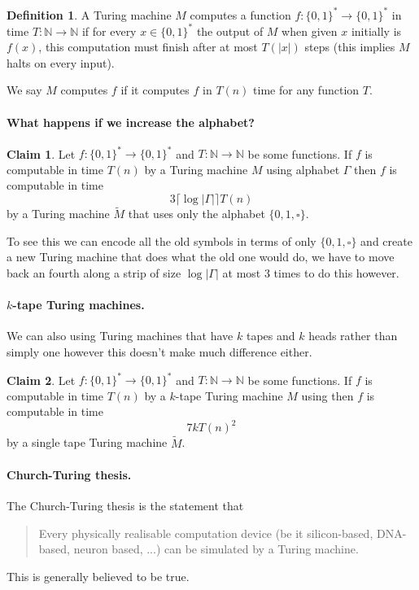 \documentclass[11pt,a4paper]{article}
\theoremstyle{definition}
\newtheorem{claim}{Claim}
\newtheorem{defn}{Definition}
\newcommand{\NN}{\mathbb{N}}
\begin{document}
\begin{defn}
A Turing machine $M$ computes a function $f\colon \{0,1\}^* \to \{0,1\}^*$ in time $T\colon \NN \to \NN$ if for every $x\in \{0,1\}^*$ the output of $M$ when given $x$ initially is $f(x)$, this computation must finish after at most $T(|x|)$ steps (this implies $M$ halts on every input).

We say $M$ computes $f$ if it computes $f$ in $T(n)$ time for any function $T$.
\end{defn}

\paragraph{What happens if we increase the alphabet?}
\begin{claim}
Let $f\colon\{0,1\}^*\to\{0,1\}^*$ and $T\colon \NN \to \NN$ be some functions.
If $f$ is computable in time $T(n)$ by a Turing machine $M$ using alphabet $\Gamma$ then $f$ is computable in time
\[
3\lceil\log|\Gamma|\rceil T(n)
\]
by a Turing machine $\tilde{M}$ that uses only the alphabet $\{0,1,\square\}$.
\end{claim}
To see this we can encode all the old symbols in terms of only $\{0,1,\square\}$ and create a new Turing machine that does what the old one would do, we have to move back an fourth along a strip of size $\log|\Gamma|$ at most 3 times to do this however.

\paragraph{$k$-tape Turing machines.}
We can also using Turing machines that have $k$ tapes and $k$ heads rather than simply one however this doesn't make much difference either.
\begin{claim}
Let $f\colon\{0,1\}^*\to\{0,1\}^*$ and $T\colon \NN \to \NN$ be some functions.
If $f$ is computable in time $T(n)$ by a $k$-tape Turing machine $M$ using then $f$ is computable in time
\[
7kT(n)^2
\]
by a single tape Turing machine $\tilde{M}$.
\end{claim}

\paragraph{Church-Turing thesis.}
The Church-Turing thesis is the statement that
\begin{quote}
Every physically realisable computation device (be it silicon-based, DNA-based, neuron based, ...) can be simulated by a Turing machine.
\end{quote}
This is generally believed to be true.
\end{document}
